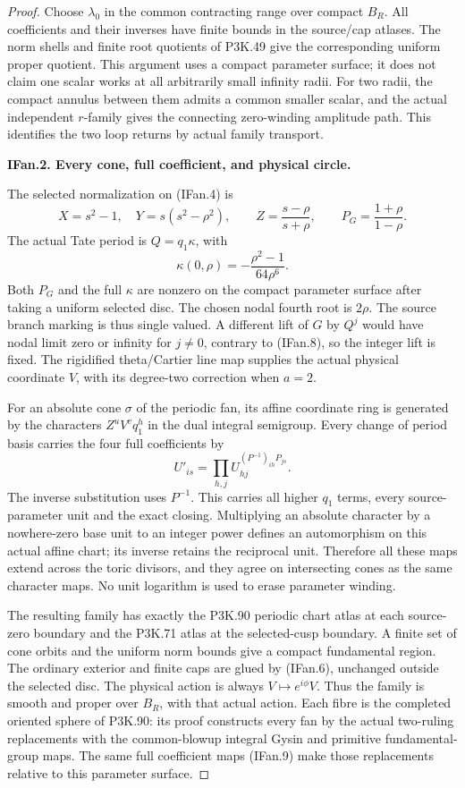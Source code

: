 \begin{proof}
Choose \(\lambda_0\) in the common contracting range over compact
\(B_R\). All coefficients and their inverses have finite bounds in
the source/cap atlases. The norm shells and finite root quotients of
P3K.49 give the corresponding uniform proper quotient. This argument
uses a compact parameter surface; it does not claim one scalar works
at all arbitrarily small infinity radii. For two radii, the compact
annulus between them admits a common smaller scalar, and the actual
independent \(r\)-family gives the connecting zero-winding amplitude
path. This identifies the two loop returns by actual family transport.

\par\medskip\noindent\textbf{IFan.2. Every cone, full coefficient, and physical circle.}\par\nopagebreak[4]

The selected normalization on (IFan.4) is
\[
 X=s^2-1,\quad Y=s(s^2-\rho^2),\qquad
 Z=\frac{s-\rho}{s+\rho},\qquad
 P_G=\frac{1+\rho}{1-\rho}.                          \tag{IFan.8}
\]
The actual Tate period is \(Q=q_1\kappa\), with
\[
 \kappa(0,\rho)=-\frac{\rho^2-1}{64\rho^6}.
\]
Both \(P_G\) and the full \(\kappa\) are nonzero on the compact
parameter surface after taking a uniform selected disc. The chosen
nodal fourth root is \(2\rho\). The source branch marking is thus
single valued. A different lift of \(G\) by \(Q^j\) would have nodal
limit zero or infinity for \(j\ne0\), contrary to (IFan.8), so the
integer lift is fixed. The rigidified theta/Cartier line map supplies
the actual physical coordinate \(V\), with its degree-two correction
when \(a=2\).

For an absolute cone \(\sigma\) of the periodic fan, its affine
coordinate ring is generated by the characters
\(Z^uV^v q_1^h\) in the dual integral semigroup. Every change of period
basis carries the four full coefficients by
\[
 U'_{is}=\prod_{h,j}U_{hj}^{(P^{-1})_{ih}P_{js}}.     \tag{IFan.9}
\]
The inverse substitution uses \(P^{-1}\). This carries all higher
\(q_1\) terms, every source-parameter unit and the exact closing.
Multiplying an absolute character by a nowhere-zero base unit to an
integer power defines an automorphism on this actual affine chart;
its inverse retains the reciprocal unit. Therefore all these maps
extend across the toric divisors, and they agree on intersecting
cones as the same character maps. No unit logarithm is used to erase
parameter winding.

The resulting family has exactly the P3K.90 periodic chart atlas at
each source-zero boundary and the P3K.71 atlas at the selected-cusp
boundary. A finite set of cone orbits and the uniform norm bounds
give a compact fundamental region. The ordinary exterior and finite
caps are glued by (IFan.6), unchanged outside the selected disc. The
physical action is always \(V\mapsto e^{i\phi}V\). Thus the family is
smooth and proper over \(B_R\), with that actual action. Each fibre
is the completed oriented sphere of P3K.90: its proof constructs every
fan by the actual two-ruling replacements with the common-blowup
integral Gysin and primitive fundamental-group maps. The same full
coefficient maps (IFan.9) make those replacements relative to this
parameter surface.


\end{proof}
